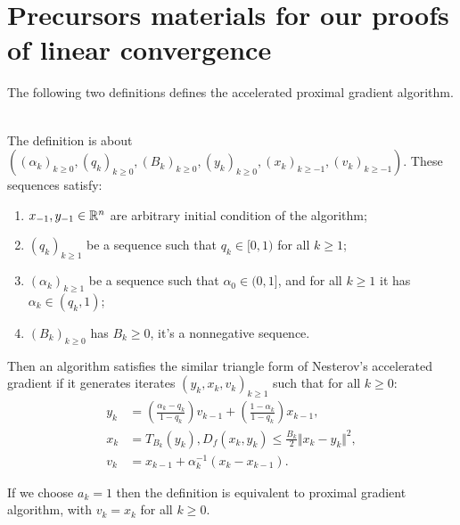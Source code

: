 \documentclass[12pt]{article}
\begin{document}
\section{Precursors materials for our proofs of linear convergence}
    The following two definitions defines the accelerated proximal gradient algorithm. 
    \begin{definition}\;\label{def:st-apg}\\
        The definition is about $((\alpha_k)_{k \ge 0}, (q_k)_{k \ge 0}, (B_k)_{k \ge 0}, (y_k)_{k \ge 0}, (x_k)_{k \ge -1}, (v_k)_{k \ge -1})$. 
        These sequences satisfy:
        \begin{enumerate}[nosep]
            \item $x_{-1}, y_{- 1}\in \mathbb R^n$ are arbitrary initial condition of the algorithm;
            \item $(q_k)_{k \ge 1}$ be a sequence such that $q_k \in [0, 1)$ for all $k \ge 1$;
            \item $(\alpha_k)_{k \ge 1}$ be a sequence such that $\alpha_0 \in (0, 1]$, and for all $k \ge 1$ it has $\alpha_k \in (q_k, 1)$;
            \item $(B_k)_{k \ge 0}$ has $B_k \ge 0$, it's a nonnegative sequence. 
        \end{enumerate}
        Then an algorithm satisfies the similar triangle form of Nesterov's accelerated gradient if it generates iterates $(y_k, x_k, v_k)_{k \ge 1}$ such that for all $k\ge 0$: 
        \begin{align*}
            y_k &= \left(\frac{\alpha_k - q_k}{1 - q_k}\right)v_{k - 1} 
            + \left(\frac{1 - \alpha_k}{1 - q_k}\right) x_{k - 1},
            \\
            x_k &= T_{B_k}(y_k), D_f(x_k, y_k) \le \frac{B_k}{2}\Vert x_k - y_k\Vert^2, 
            \\
            v_k &= x_{k - 1} + \alpha_k^{-1}(x_k - x_{k - 1}). 
        \end{align*}
    \end{definition}
    \begin{remark}
        If we choose $a_k = 1$ then the definition is equivalent to proximal gradient algorithm, with $v_k = x_k$ for all $k \ge 0$. 
        
    \end{remark}
\end{document}

